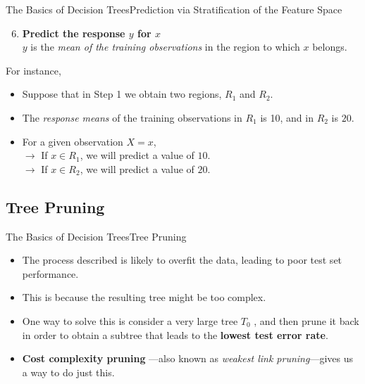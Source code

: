 \begin{frame}{The Basics of Decision Trees}{Prediction via Stratification of the Feature Space}

    \begin{enumerate}
    \setcounter{enumi}{5}
        \item \textbf{Predict the response $y$ for $x$}\\ \pause  
        $y$ is the \textit{mean of the training observations} in the region to which $x$ belongs. \pause 
    \end{enumerate}
    For instance, 
    \begin{itemize}
        \item Suppose that in Step 1 we obtain two regions, $R_1$ and $R_2$. \pause 
        \item The \textit{response means} of the training observations in $R_1$ is 10, and  in $R_2$ is $20$. \pause 
        \item  For a given observation $X = x$, \\ \pause 
        $\rightarrow$ If $x \in R_1$, we will predict a value of $10$. \pause \\ 
        $\rightarrow$ If $x \in R_2$, we will predict a value of $20$. \pause
    \end{itemize}
    
\end{frame}


\subsection{Tree Pruning}
\begin{frame}{The Basics of Decision Trees}{Tree Pruning}

\begin{itemize}
    \item The process described is likely to overfit the data, leading to poor test set performance. \pause 
    \item This is because the resulting tree might be too complex. \pause 
    \item One way to solve this is consider a very large tree $T_0$ , and then prune it back in order to obtain a subtree that leads to the \textbf{lowest test error rate}. \pause 
    \item \textbf{Cost complexity pruning} —also known as \textit{weakest link pruning}—gives us a way to do just this.
    
\end{itemize}

\end{frame}

